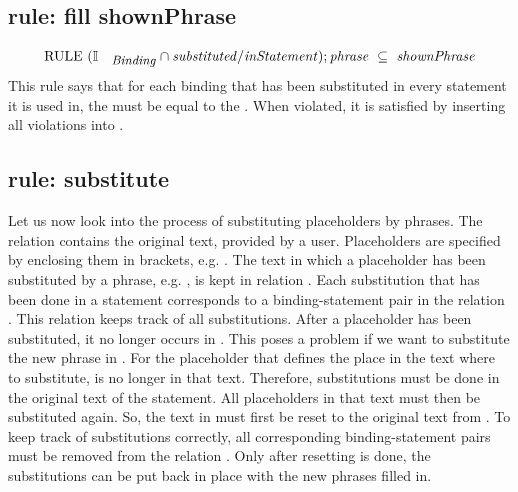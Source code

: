 \documentclass{svproc}
\begin{document}
\subsection{rule: fill shownPhrase}
\label{rule: fill shownPhrase}

\[\text{RULE}\ (\ident{Binding}\cap\id{substituted}/\id{inStatement} );\id{phrase}\ \subs\ \id{shownPhrase} \]
        This rule says that for each binding that has been substituted in every statement it is used in,
	the  must be equal to the .
	When violated, it is satisfied by inserting all violations into .

\subsection{rule: substitute}
\label{rule: substitute}
	Let us now look into the process of substituting placeholders by phrases.
	The relation  contains the original text, provided by a user.
	Placeholders are specified by enclosing them in brackets,
	e.g. .
	The text in which a placeholder has been substituted by a phrase,
	e.g. ,
	is kept in relation .
	Each substitution that has been done in a statement corresponds to a binding-statement pair in the relation .
	This relation keeps track of all substitutions.
	After a placeholder has been substituted, it no longer occurs in .
	This poses a problem if we want to substitute the new phrase in .
    For the placeholder that defines the place in the text where to substitute, is no longer in that text.
	Therefore, substitutions must be done in the original text of the statement.
	All placeholders in that text must then be substituted again.
	So, the text in  must first be reset to the original text from .
	To keep track of substitutions correctly, all corresponding binding-statement pairs must be removed from the relation .
	Only after resetting is done, the substitutions can be put back in place with the new phrases filled in.
	
\end{document}

